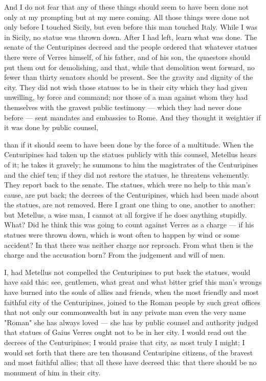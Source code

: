  And I do not fear that any of these things should seem to have been done not only at my prompting but at my mere coming. All those things were done not only before I touched Sicily, but even before this man touched Italy. While I was in Sicily, no statue was thrown down. After I had left, learn what was done. The senate of the Centuripines decreed and the people ordered that whatever statues there were of Verres himself, of his father, and of his son, the quaestors should put them out for demolishing, and that, while that demolition went forward, no fewer than thirty senators should be present. See the gravity and dignity of the city. They did not wish those statues to be in their city which they had given unwilling, by force and command; nor those of a man against whom they had themselves with the gravest public testimony --- which they had never done before --- sent mandates and embassies to Rome. And they thought it weightier if it was done by public counsel,

 than if it should seem to have been done by the force of a multitude. When the Centuripines had taken up the statues publicly with this counsel, Metellus hears of it; he takes it gravely; he summons to him the magistrates of the Centuripines and the chief ten; if they did not restore the statues, he threatens vehemently. They report back to the senate. The statues, which were no help to this man's cause, are put back; the decrees of the Centuripines, which had been made about the statues, are not removed. Here I grant one thing to one, another to another: but Metellus, a wise man, I cannot at all forgive if he does anything stupidly. What? Did he think this was going to count against Verres as a charge --- if his statues were thrown down, which is wont often to happen by wind or some accident? In that there was neither charge nor reproach. From what then is the charge and the accusation born? From the judgement and will of men.

 I, had Metellus not compelled the Centuripines to put back the statues, would have said this: see, gentlemen, what great and what bitter grief this man's wrongs have burned into the souls of allies and friends, when the most friendly and most faithful city of the Centuripines, joined to the Roman people by such great offices that not only our commonwealth but in any private man even the very name "Roman" she has always loved --- she has by public counsel and authority judged that statues of Gaius Verres ought not to be in her city. I would read out the decrees of the Centuripines; I would praise that city, as most truly I might; I would set forth that there are ten thousand Centuripine citizens, of the bravest and most faithful allies; that all these have decreed this: that there should be no monument of him in their city.

